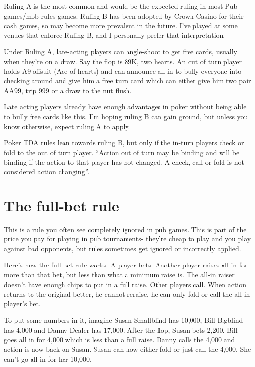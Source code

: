 Ruling A is the most common and would be the expected ruling in most
Pub games/mob rules games. Ruling B has been adopted
by Crown Casino for their cash games, so may become more prevalent
in the future. I've played at some venues that enforce Ruling B, and
I personally prefer that interpretation.

Under Ruling A, late-acting players can angle-shoot to get free
cards, usually when they're on a draw. Say the flop is 89K, two hearts.
An out of turn player holds A9 offsuit (Ace of hearts) and can announce
all-in to bully everyone into checking around and give him a free
turn card which can either give him two pair AA99, trip 999 or a draw
to the nut flush.

Late acting players already have enough advantages in poker without 
being able to bully free cards like this. I'm hoping ruling B can 
gain ground, but unless you know otherwise, expect ruling A to apply.

Poker TDA rules lean towards ruling B, but only if the in-turn players
check or fold to the out of turn player. ``Action out of turn may be binding
and will be binding if the action to that player has not changed. A
check, call or fold is not considered action changing''.


\section{The full-bet rule}

This is a rule you often see completely ignored in pub games. 
This is part of the price you pay for playing
in pub tournaments- they're cheap to play and you play against
bad opponents, but rules sometimes get ignored or incorrectly applied.


Here's how the full bet rule works. A player bets. Another player 
raises all-in for more than that bet, but less than what a minimum raise is. 
The all-in raiser doesn't have enough chips to put in a full raise. 
Other players call. When action returns to the original better, he 
cannot reraise, he can only fold or call the all-in player's bet.

To put some numbers in it, imagine Susan Smallblind has 10,000,
Bill Bigblind has 4,000 and Danny Dealer has 17,000. After the flop, 
Susan bets 2,200. Bill goes all in for 4,000 which is less
than a full raise. Danny calls the 4,000 and action is now back on Susan.
Susan can now either fold or just call the 4,000. She can't go all-in 
for her 10,000.


